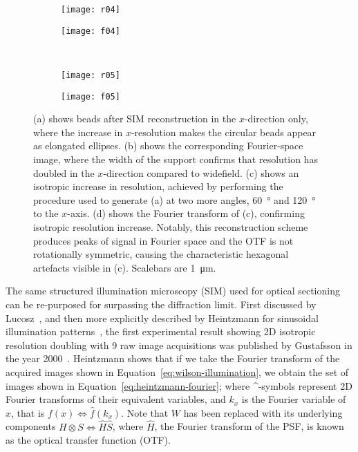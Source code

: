 \begin{figure}[p]
\centering
\begin{subfigure}[b]{0.45\textwidth}
	\texttt{[image: r04]}
	\caption{}\label{fig:beads-x-doubling}
\end{subfigure}
\raisebox{9.3em}{\noindent\Huge$\Leftrightarrow$}
\begin{subfigure}[b]{0.45\textwidth}
	\texttt{[image: f04]}
	\caption{}\label{fig:fourier-x-doubling}
\end{subfigure}
~\newline
\begin{subfigure}[b]{0.45\textwidth}
	\texttt{[image: r05]}
	\caption{}\label{fig:beads-isotropic-doubling}
\end{subfigure}
\raisebox{9.3em}{\noindent\Huge$\Leftrightarrow$}
\begin{subfigure}[b]{0.45\textwidth}
	\texttt{[image: f05]}
	\caption{}\label{fig:fourier-isotropic-doubling}
\end{subfigure}
\caption[LAG SIM: Reconstruction of SIM images takes place in Fourier space]{(a) shows beads after SIM reconstruction in the $x$-direction only, where the increase in $x$-resolution makes the circular beads appear as elongated ellipses.
(b) shows the corresponding Fourier-space image, where the width of the support confirms that resolution has doubled in the $x$-direction compared to widefield.
(c) shows an isotropic increase in resolution, achieved by performing the procedure used to generate (a) at two more angles, \SI{60}{\degree} and \SI{120}{\degree} to the $x$-axis.
(d) shows the Fourier transform of (c), confirming isotropic resolution increase. Notably, this reconstruction scheme produces peaks of signal in Fourier space and the OTF is not rotationally symmetric, causing the characteristic hexagonal artefacts visible in (c). Scalebars are \SI{1}{\micro\metre}.}
\label{fig:fourier-reconstruction-continued}
\end{figure}

The same structured illumination microscopy (SIM) used for optical sectioning can be re-purposed for surpassing the diffraction limit.
First discussed by Lucosz~\cite{lukosz1966optical}, and then more explicitly described by Heintzmann for sinusoidal illumination patterns~\cite{heintzmann1999laterally}, the first experimental result showing 2D isotropic resolution doubling with 9 raw image acquisitions was published by Gustafsson in the year \num{2000}~\cite{gustafsson2000surpassing}.
Heintzmann shows that if we take the Fourier transform of the acquired images shown in Equation~\ref{eq:wilson-illumination}, we obtain the set of images shown in Equation~\ref{eq:heintzmann-fourier}; where \^{}-symbols represent 2D Fourier transforms of their equivalent variables, and $k_x$ is the Fourier variable of $x$, that is $f(x) \Leftrightarrow \hat{f}(k_x)$.
Note that $W$ has been replaced with its underlying components $H\otimes S \Leftrightarrow \hat{H}\hat{S}$, where $\hat{H}$, the Fourier transform of the PSF, is known as the optical transfer function (OTF).

